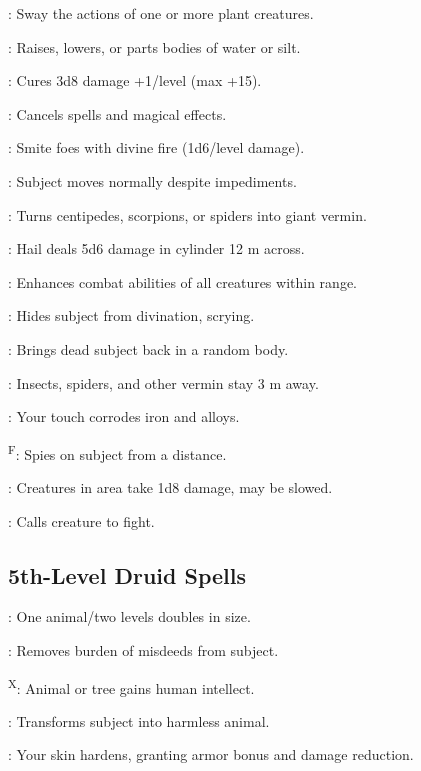 : Sway the actions of one or more plant creatures.

: Raises, lowers, or parts bodies of water or silt.

: Cures 3d8 damage +1/level (max +15).

: Cancels spells and magical effects.

: Smite foes with divine fire (1d6/level damage).

: Subject moves normally despite impediments.

: Turns centipedes, scorpions, or spiders into giant vermin.

: Hail deals 5d6 damage in cylinder 12 m across.

: Enhances combat abilities of all creatures within range.

: Hides subject from divination, scrying.

: Brings dead subject back in a random body.

: Insects, spiders, and other vermin stay 3 m away.

: Your touch corrodes iron and alloys.

\textsuperscript{F}: Spies on subject from a distance.

: Creatures in area take 1d8 damage, may be slowed.

: Calls creature to fight.



\subsection{5th-Level Druid Spells}

: One animal/two levels doubles in size.

: Removes burden of misdeeds from subject.

\textsuperscript{X}: Animal or tree gains human intellect.

: Transforms subject into harmless animal.

: Your skin hardens, granting armor bonus and damage reduction.


